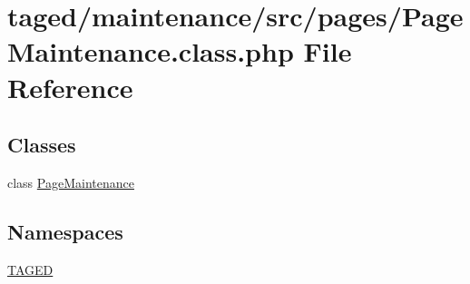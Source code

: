 \hypertarget{_page_maintenance_8class_8php}{}\section{taged/maintenance/src/pages/\+Page\+Maintenance.class.\+php File Reference}
\label{_page_maintenance_8class_8php}
\subsection*{Classes}
\begin{DoxyCompactItemize}
\item 
class \hyperlink{class_page_maintenance}{Page\+Maintenance}
\end{DoxyCompactItemize}
\subsection*{Namespaces}
\begin{DoxyCompactItemize}
\item 
 \hyperlink{namespace_t_a_g_e_d}{T\+A\+G\+ED}
\end{DoxyCompactItemize}
